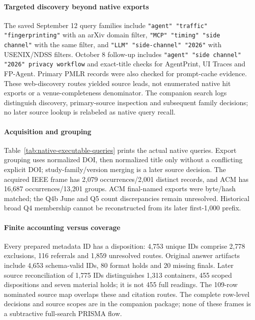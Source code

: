 

\paragraph{Targeted discovery beyond native exports}
The saved September 12 query families include \texttt{"agent" "traffic" "fingerprinting"} with an arXiv domain filter, \texttt{"MCP" "timing" "side channel"} with the same filter, and \texttt{"LLM" "side-channel" "2026"} with USENIX/NDSS filters. October 8 follow-up includes \texttt{"agent" "side channel" "2026" privacy workflow} and exact-title checks for AgentPrint, UI Traces and FP-Agent. Primary PMLR records were also checked for prompt-cache evidence. These web-discovery routes yielded source leads, not enumerated native hit exports or a venue-completeness denominator. The companion search logs distinguish discovery, primary-source inspection and subsequent family decisions; no later source lookup is relabeled as native query recall.

\paragraph{Acquisition and grouping}
Table~\ref{tab:native-executable-queries} prints the actual native queries. Export grouping uses normalized DOI, then normalized title only without a conflicting explicit DOI; study-family/version merging is a later source decision. The acquired IEEE frame has 2,079 occurrences/2,001 distinct records, and ACM has 16,687 occurrences/13,201 groups. ACM final-named exports were byte/hash matched; the Q4b June and Q5 count discrepancies remain unresolved. Historical broad Q4 membership cannot be reconstructed from its later first-1,000 prefix.

\paragraph{Finite accounting versus coverage}
Every prepared metadata ID has a disposition: 4,753 unique IDs comprise 2,778 exclusions, 116 referrals and 1,859 unresolved routes. Original answer artifacts include 4,653 schema-valid IDs, 80 format holds and 20 missing finals. Later source reconciliation of 1,775 IDs distinguishes 1,313 containers, 455 scoped dispositions and seven material holds; it is not 455 full readings. The 109-row nominated source map overlaps these and citation routes. The complete row-level decisions and source scopes are in the companion package; none of these frames is a subtractive full-search PRISMA flow.

